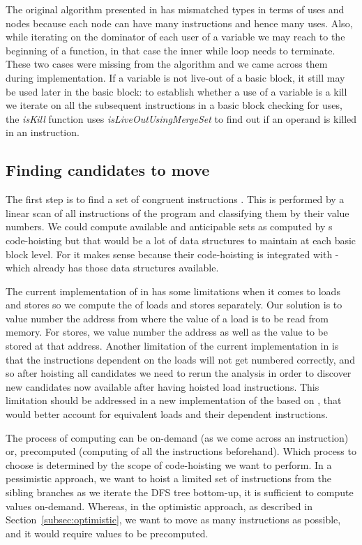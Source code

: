 \documentclass[acmlarge,review,anonymous]{acmart}\settopmatter{printfolios=true}
\begin{document}
The original algorithm presented in \cite{das2012} has mismatched types in terms
of uses and nodes because each node can have many instructions and hence many
uses. Also, while iterating on the dominator of each user of a variable we may
reach to the beginning of a function, in that case the inner while loop needs to
terminate. These two cases were missing from the algorithm and we came across
them during implementation. If a variable is not live-out of a basic block, it
still may be used later in the basic block: to establish whether a use of a
variable is a kill we iterate on all the subsequent instructions in a basic
block checking for uses, the \emph{isKill} function uses
\emph{isLiveOutUsingMergeSet} to find out if an operand is killed in an
instruction.

\subsection{Finding candidates to move}
\label{subsec:finding-candidates}
The first step is to find a set of congruent instructions
\cite{briggs1997}. This is performed by a linear scan of all instructions of the
program and classifying them by their value numbers. We could compute available
and anticipable sets as computed by s code-hoisting but that would be a lot
of data structures to maintain at each basic block level. For \GCC{} it makes sense
because their code-hoisting is integrated with \GVN{}-\PRE{} which already has those
data structures available.

The current implementation of \GVN{} in \LLVM{} has some limitations when it
comes to loads and stores so we compute the \GVN{} of loads and stores
separately.  Our solution is to value number the address from where the value of
a load is to be read from memory. For stores, we value number the address as
well as the value to be stored at that address. Another limitation of the
current \GVN{} implementation in \LLVM{} is that the instructions dependent on
the loads will not get numbered correctly, and so after hoisting all candidates
we need to rerun the \GVN{} analysis in order to discover new candidates now
available after having hoisted load instructions.  This limitation should be
addressed in a new implementation of the \GVN{} based on \MemorySSA{}, that
would better account for equivalent loads and their dependent instructions.

The process of computing \GVN{} can be on-demand (as we come across an
instruction) or, precomputed (computing \GVN{} of all the instructions
beforehand). Which process to choose is determined by the scope of code-hoisting
we want to perform. In a pessimistic approach, we want to hoist a limited set of
instructions from the sibling branches as we iterate the DFS tree bottom-up, it
is sufficient to compute \GVN{} values on-demand. Whereas, in the optimistic
approach, as described in Section~\ref{subsec:optimistic}, we want to move as
many instructions as possible, and it would require \GVN{} values to be
precomputed.
\end{document}
